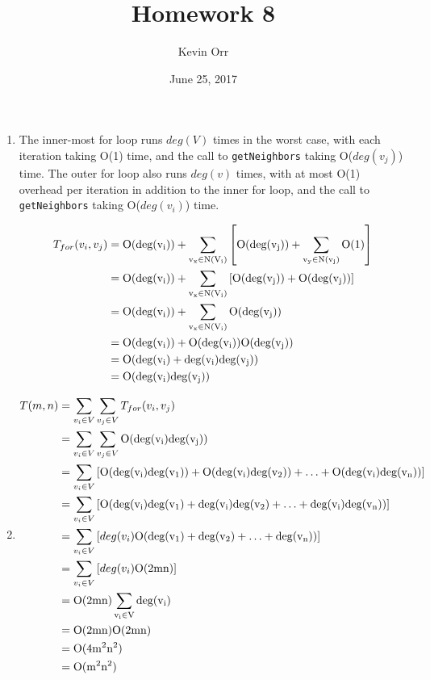 \documentclass[11pt]{article}
\author{Kevin Orr}
\date{June 25, 2017}
\title{Homework 8}
\begin{document}
\maketitle
\begin{enumerate}
\item The inner-most for loop runs \(deg(V)\) times in the worst case, with each iteration taking
O(1) time, and the call to \texttt{getNeighbors} taking O(\(deg(v_j)\)) time. The outer for loop also
runs \(deg(v)\) times, with at most O(1) overhead per iteration in addition to the inner for
loop, and the call to \texttt{getNeighbors} taking O(\(deg(v_i)\)) time.

\begin{equation*}
\begin{align*}
  T_{for}(v_i, v_j) &= \rm O(deg(v_i)) + \sum_{v_x\in N(V_i)} \left[ \rm O(deg(v_j)) + \sum_{v_y\in N(v_j)} \rm O(1) \right] \\
                    &= \rm O(deg(v_i)) + \sum_{v_x\in N(V_i)} \left[ \rm O(deg(v_j)) + \rm O(deg(v_j)) \right] \\
                    &= \rm O(deg(v_i)) + \sum_{v_x\in N(V_i)} \rm O(deg(v_j)) \\
                    &= \rm O(deg(v_i)) + \rm O(deg(v_i)) \rm O(deg(v_j)) \\
                    &= \rm O(deg(v_i) + deg(v_i) deg(v_j)) \\
                    &= \rm O(deg(v_i) deg(v_j))
\end{align*}
\end{equation*}

\item \begin{equation*}
\begin{align*}
  T(m, n) &= \sum_{v_i \in V} \sum_{v_j \in V} T_{for}(v_i, v_j) \\
          &= \sum_{v_i \in V} \sum_{v_j \in V} \rm O(deg(v_i) deg(v_j)) \\
          &= \sum_{v_i \in V} \left[ \rm O(deg(v_i)deg(v_1)) + \rm O(deg(v_i)deg(v_2)) + \ldots + \rm O(deg(v_i)deg(v_n)) \right] \\
          &= \sum_{v_i \in V} \left[ \rm O(deg(v_i)deg(v_1) + deg(v_i)deg(v_2) + \ldots + deg(v_i)deg(v_n)) \right] \\
          &= \sum_{v_i \in V} \left[ deg(v_i) \rm O(deg(v_1) + deg(v_2) + \ldots + deg(v_n)) \right] \\
          &= \sum_{v_i \in V} \left[ deg(v_i) \rm O(2mn) \right] \\
          &= \rm O(2mn) \sum_{v_i \in V} deg(v_i) \\
          &= \rm O(2mn) \rm O(2mn) \\
          &= \rm O(4m^2n^2) \\
          &= \rm O(m^2n^2)
\end{align*}
\end{equation*}


\end{enumerate}
\end{document}
